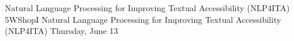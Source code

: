 \begin{wsschedule}
{Natural Language Processing for Improving Textual Accessibility (NLP4ITA)}
{5}{WShopI}
{Natural Language Processing for Improving Textual Accessibility (NLP4ITA)}
{Thursday, June 13}{\WShopLocI}

\end{wsschedule}

